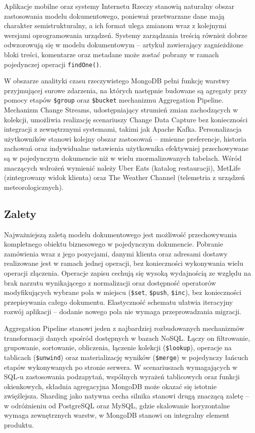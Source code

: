 Aplikacje mobilne oraz systemy Internetu Rzeczy stanowią naturalny obszar
zastosowania modelu dokumentowego, ponieważ przetwarzane dane mają charakter
semistrukturalny, a ich format ulega zmianom wraz z kolejnymi wersjami
oprogramowania urządzeń. Systemy zarządzania treścią również dobrze odwzorowują
się w modelu dokumentowym -- artykuł zawierający zagnieżdżone bloki treści,
komentarze oraz metadane może zostać pobrany w ramach pojedynczej operacji
\texttt{findOne()}.

W obszarze analityki czasu rzeczywistego MongoDB pełni funkcję warstwy
przyjmującej surowe zdarzenia, na których następnie budowane są agregaty
przy pomocy etapów \texttt{\$group} oraz \texttt{\$bucket} mechanizmu
Aggregation Pipeline. Mechanizm Change Streams, udostępniający strumień
zmian zachodzących w kolekcji, umożliwia realizację scenariuszy
Change Data Capture bez konieczności integracji z zewnętrznymi systemami,
takimi jak Apache Kafka. Personalizacja użytkowników stanowi kolejny obszar
zastosowań -- zmienne preferencje, historia zachowań oraz indywidualne
ustawienia użytkownika efektywniej przechowywane są w pojedynczym dokumencie
niż w wielu znormalizowanych tabelach. Wśród znaczących wdrożeń wymienić
należy Uber Eats (katalog restauracji), MetLife (zintegrowany widok klienta)
oraz The Weather Channel (telemetria z urządzeń meteorologicznych).

\subsection{Zalety}

Najważniejszą zaletą modelu dokumentowego jest możliwość przechowywania
kompletnego obiektu biznesowego w pojedynczym dokumencie. Pobranie zamówienia
wraz z jego pozycjami, danymi klienta oraz adresami dostawy realizowane jest
w ramach jednej operacji, bez konieczności wykonywania wielu operacji
złączenia. Operacje zapisu cechują się wysoką wydajnością ze względu na brak
narzutu wynikającego z normalizacji oraz dostępność operatorów modyfikujących
wybrane pola w miejscu (\texttt{\$set}, \texttt{\$push}, \texttt{\$inc}),
bez konieczności przepisywania całego dokumentu. Elastyczność schematu
ułatwia iteracyjny rozwój aplikacji -- dodanie nowego pola nie wymaga
przeprowadzania migracji.

Aggregation Pipeline stanowi jeden z najbardziej rozbudowanych mechanizmów
transformacji danych spośród dostępnych w bazach NoSQL. Łączy on filtrowanie,
grupowanie, sortowanie, obliczenia, łączenie kolekcji (\texttt{\$lookup}),
operacje na tablicach (\texttt{\$unwind}) oraz materializację wyników
(\texttt{\$merge}) w pojedynczy łańcuch etapów wykonywanych po stronie serwera.
W scenariuszach wymagających w SQL-u zastosowania podzapytań, wspólnych
wyrażeń tablicowych oraz funkcji okienkowych, składnia agregacyjna MongoDB
może okazać się istotnie zwięźlejsza. Sharding jako natywna cecha silnika
stanowi drugą znaczącą zaletę -- w odróżnieniu od PostgreSQL oraz MySQL,
gdzie skalowanie horyzontalne wymaga zewnętrznych warstw, w MongoDB stanowi
on integralny element produktu.

